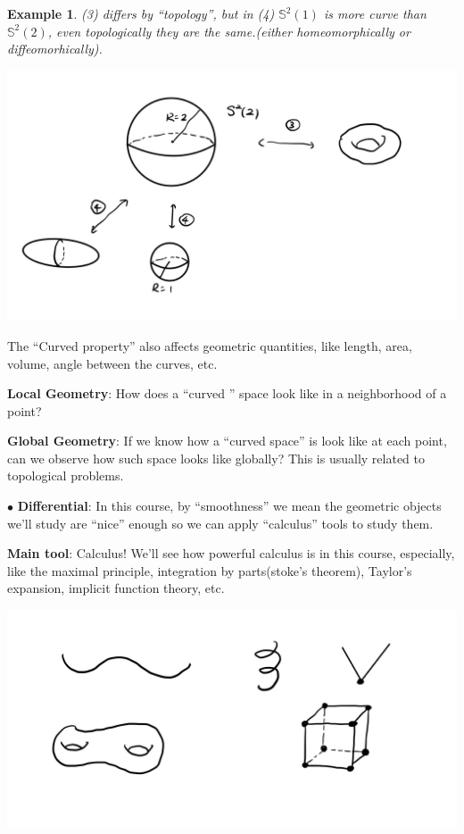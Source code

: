 \documentclass[UTF8,oneside,11pt]{book}
\theoremstyle{plain}\newtheorem{thm}{Theorem}
\theoremstyle{definition}\newtheorem{defn}[thm]{Definition}
\theoremstyle{plain}\newtheorem{axiom}[thm]{Axiom}
\theoremstyle{plain}\newtheorem{coro}[thm]{Corollary}
\theoremstyle{plain}\newtheorem{lemma}[thm]{Lemma}
\theoremstyle{plain}\newtheorem{prop}[thm]{Proposition}
\theoremstyle{plain}\newtheorem{conj}[thm]{Conjecture}
\theoremstyle{plain}\newtheorem{ques}[thm]{Problem}
\theoremstyle{plain}\newtheorem{const}[thm]{Construction}
\theoremstyle{remark}\newtheorem{notation}[thm]{Notation}
\theoremstyle{plain}\newtheorem*{app}{Application}
\theoremstyle{plain}\newtheorem*{exam}{Example}
\theoremstyle{plain}\newtheorem*{exer}{Exercise}
\theoremstyle{remark}\newtheorem*{remark}{Remark}
\theoremstyle{remark}\newtheorem*{note}{\small{Note}}
\numberwithin{equation}{section}
\numberwithin{thm}{section}
\begin{document}
\begin{exam}
    (3) differs by ``topology'', but in (4) $\mathbb{S}^2(1)$ is more curve than $\mathbb{S}^2(2)$, even topologically they are the same.(either homeomorphically or diffeomorhically).
\end{exam}

\begin{center}
    \includegraphics[scale=0.2]{picture/preface_example2.jpg}
\end{center}

The ``Curved property'' also affects geometric quantities, like length, area, volume, angle between the curves, etc.

\textbf{Local Geometry}: How does a ``curved '' space look like in a neighborhood of a point?
 
\textbf{Global Geometry}: If we know how a ``curved space'' is look like at each point, can we observe how such space looks like globally? This is usually related to topological problems.

$\bullet$ \textbf{Differential}: In this course, by ``smoothness'' we mean the geometric objects we'll study are ``nice'' enough so we can apply ``calculus'' tools to study them.

\textbf{Main tool}: Calculus! We'll see how powerful calculus is in this course, especially, like the maximal principle, integration by parts(stoke's theorem), Taylor's expansion, implicit function theory, etc.

\begin{center}
    \includegraphics[scale=0.2]{picture/preface_example3.jpg}
\end{center}
\end{document}
